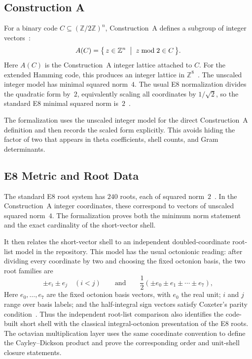 \documentclass[12pt]{article}
\theoremstyle{definition}
\newcommand{\Z}{\mathbb{Z}}
\begin{document}
\subsection{Construction A}

For a binary code $C \subseteq (\Z/2\Z)^n$, Construction~A defines a subgroup
of integer vectors~\cite{LeechSloane1971,ConwaySloane1999}:
\[
  A(C) = \bigl\{\, z \in \Z^n \;\bigm|\; z \bmod 2 \in C \,\bigr\}.
\]
Here \(A(C)\) is the Construction~A integer lattice attached to \(C\).
For the extended Hamming code, this produces an integer lattice in
$\Z^8$~\cite{LeechSloane1971}.  The unscaled integer model has minimal squared
norm~$4$.  The usual E8 normalization divides the quadratic form by~$2$,
equivalently scaling all coordinates by $1/\sqrt{2}$, so the standard E8
minimal squared norm is~$2$~\cite{ConwaySloane1999}.

The formalization uses the unscaled integer model for the direct Construction~A
definition and then records the scaled form explicitly.  This avoids hiding the
factor of two that appears in theta coefficients, shell counts, and Gram
determinants.

\subsection{E8 Metric and Root Data}

The standard E8 root system has $240$ roots, each of squared norm~$2$~\cite{ConwaySloane1999}.
In the Construction~A integer coordinates, these correspond to vectors of
unscaled squared norm~$4$.  The formalization proves both the minimum norm
statement and the exact cardinality of the short-vector shell.

It then relates the short-vector shell to an independent doubled-coordinate
root-list model in the repository.  This model has the usual octonionic
reading: after dividing every coordinate by two and choosing the fixed
octonion basis, the two root families are
\[
  \pm e_i \pm e_j \quad (i<j)
  \qquad\text{and}\qquad
  \frac12(\pm e_0 \pm e_1 \pm \cdots \pm e_7),
\]
Here \(e_0,\ldots,e_7\) are the fixed octonion basis vectors, with \(e_0\) the
real unit; \(i\) and \(j\) range over basis labels; and the half-integral sign
vectors satisfy Coxeter's parity condition~\cite{Coxeter1946,Baez2002}.  Thus
the independent root-list comparison also identifies the code-built short shell
with the classical integral-octonion presentation of the E8 roots.  The
octavian multiplication layer uses the same coordinate convention to define the
Cayley--Dickson product and prove the corresponding order and unit-shell
closure statements.
\end{document}
